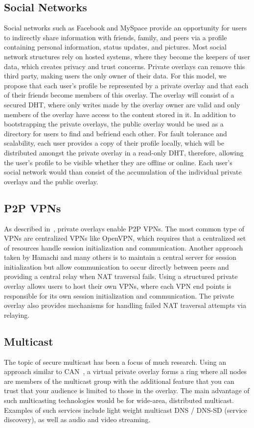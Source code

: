 \documentclass[conference]{IEEEtran}
\begin{document}
\subsection{Social Networks}
Social networks such as Facebook and MySpace provide an opportunity for users to
indirectly share information with friends, family, and peers via a profile
containing personal information, status updates, and pictures.
Most social network structures rely on hosted systems, where they become
the keepers of user data, which creates privacy and trust concerns.  Private overlays
can remove this third party, making users the only owner of their data.  For this
model, we propose that each user's profile be represented by a private overlay
and that each of their friends become members of this overlay.  The overlay will
consist of a secured DHT, where only writes made by the overlay owner are valid
and only members of the overlay have access to the content stored in it.  In
addition to bootstrapping the private overlays, the public overlay would be
used as a directory for users to find and befriend each other.  For fault
tolerance and scalability, each user provides a copy of their profile
locally, which will be distributed amongst the private overlay in a read-only
DHT, therefore, allowing the user's profile to be visible whether they are
offline or online.  Each user's social network would than consist of the
accumulation of the individual private overlays and the public overlay.

\subsection{P2P VPNs}
As described in~\cite{nsdi10}, private overlays enable P2P VPNs.  The most
common type of VPNs are centralized VPNs like OpenVPN, which requires that a
centralized set of resources handle session initialization and communication.
Another approach taken by Hamachi and many others is to maintain a central
server for session initialization but allow communication to occur directly
between peers and providing a central relay when NAT traversal fails.  Using
a structured private overlay allows users to host their own VPNs, where each
VPN end points is responsible for its own session initialization and
communication.  The private overlay also provides mechanisms for handling
failed NAT traversal attempts via relaying.

\subsection{Multicast}
The topic of secure multicast has been a focus of much research.
Using an approach similar to CAN~\cite{can_multicast}, a virtual private overlay forms
a ring where all nodes are members of the multicast group with the additional
feature that you can trust that your audience is limited to those in the
overlay.  The main advantage of such multicasting technologies would be for
wide-area, distributed multicast.  Examples of such services include 
light weight multicast DNS / DNS-SD (service discovery), as well as
audio and video streaming.
\end{document}

